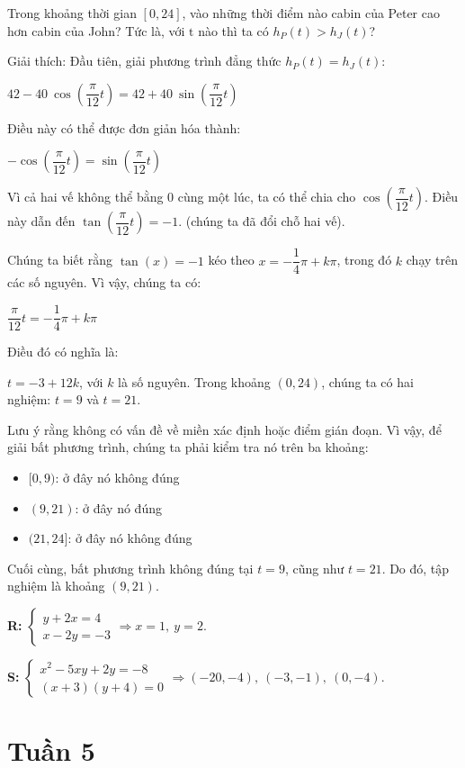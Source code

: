 \documentclass[12pt,a4paper]{article}
\begin{document}
Trong khoảng thời gian \([0,24]\), vào những thời điểm nào cabin của Peter cao hơn cabin của John? Tức là, với \(\text{t}\) nào thì ta có \(h_{P}(t)>h_{J}(t)\)?

Giải thích: Đầu tiên, giải phương trình đẳng thức \(h_{P}(t)=h_{J}(t)\):                 

\(42-40~\cos (\dfrac{\pi }{12}t)=42+40~\sin (\dfrac{\pi }{12}t)\)

Điều này có thể được đơn giản hóa thành:

\(-\cos (\dfrac{\pi }{12}t)=\sin (\dfrac{\pi }{12}t)\)

Vì cả hai vế không thể bằng 0 cùng một lúc, ta có thể chia cho \(\cos (\dfrac{\pi }{12}t)\). Điều này dẫn đến \(\tan (\dfrac{\pi }{12}t)=-1\). (chúng ta đã đổi chỗ hai vế).

Chúng ta biết rằng \(\tan (x)=-1\) kéo theo \(x=-\dfrac{1}{4}\pi +k\pi \), trong đó \(k\) chạy trên các số nguyên. Vì vậy, chúng ta có:

\(\dfrac{\pi }{12}t=-\dfrac{1}{4}\pi +k\pi \)

Điều đó có nghĩa là:

\(t=-3+12k\),  với \(k\) là số nguyên. Trong khoảng \((0,24)\), chúng ta có hai nghiệm: \(t=9\) và \(t=21\).

Lưu ý rằng không có vấn đề về miền xác định hoặc điểm gián đoạn. Vì vậy, để giải bất phương trình, chúng ta phải kiểm tra nó trên ba khoảng:

\begin{itemize}
    \item \([0,9)\): ở đây nó không đúng
    \item \((9,21)\): ở đây nó đúng
    \item \((21,24]\): ở đây nó không đúng
\end{itemize}

Cuối cùng, bất phương trình không đúng tại \(t=9\), cũng như \(t=21\). Do đó, tập nghiệm là khoảng \((9,21)\).

\textbf{R:} $\begin{cases} y+2x=4 \\ x-2y=-3 \end{cases} \Rightarrow x=1,\ y=2$.

\textbf{S:} $\begin{cases} x^2-5xy+2y=-8 \\ (x+3)(y+4)=0 \end{cases} \Rightarrow (-20,-4),\ (-3,-1),\ (0,-4)$.

\newpage
\section{Tuần 5}
\end{document}

